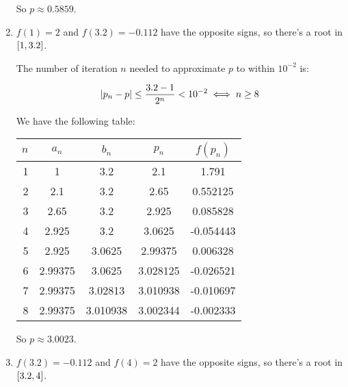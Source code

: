 \documentclass[../../Assignments.tex]{subfiles}
\begin{document}
\begin{solution}
\begin{enumerate}[label=(\alph*)]
            So \(p \approx \num{0.5859}\).

        \item \(f(1) = 2\) and \(f(\num{3.2}) = \num{-0.112}\) have the opposite
            signs, so there's a root in \(\interval{1}{\num{3.2}}\).

            The number of iteration \(n\) needed to approximate \(p\) to within
            \(10^{-2}\) is:

            \[\abs{p_n - p} \leq \frac{\num{3.2} - 1}{2^n} < 10^{-2} \iff n \geq 8\]

            We have the following table:

            \begin{table}[hbt!]
                \centering
                \begin{tabular}{r S[table-format=1.5] S[table-format=1.6] S[table-format=1.6] S[table-format=-1.6]}
                    \toprule
                    \(n\)  &  {\(a_n\)}  &  {\(b_n\)}  &  {\(p_n\)}  &  {\(f(p_n)\)}  \\
                      &  1          &  3.2        &  2.1        &   1.791        \\
                        2  &  2.1        &  3.2        &  2.65       &   0.552125     \\
                        3  &  2.65       &  3.2        &  2.925      &   0.085828     \\
                        4  &  2.925      &  3.2        &  3.0625     &  -0.054443     \\
                        5  &  2.925      &  3.0625     &  2.99375    &   0.006328     \\
                        6  &  2.99375    &  3.0625     &  3.028125   &  -0.026521     \\
                        7  &  2.99375    &  3.02813    &  3.010938   &  -0.010697     \\
                        8  &  2.99375    &  3.010938   &  3.002344   &  -0.002333     \\
                    \bottomrule
                \end{tabular}
            \end{table}

            So \(p \approx \num{3.0023}\).

        \item \(f(\num{3.2}) = \num{-0.112}\) and \(f(4) = 2\) have the opposite
            signs, so there's a root in \(\interval{\num{3.2}}{4}\).


\end{enumerate}
\end{solution}
\end{document}

